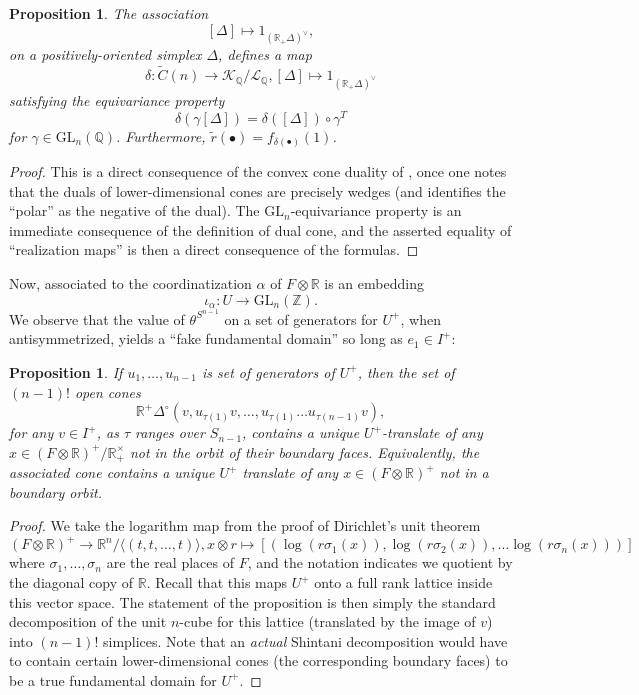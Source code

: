 \documentclass[10pt]{amsart}
\newtheorem{prop}[thm]{Proposition}
\theoremstyle{definition}
\newcommand{\Z}{\mathbb{Z}}
\newcommand{\Q}{\mathbb{Q}}
\newcommand{\R}{\mathbb{R}}
\newcommand{\GL}{\mathrm{GL}}
\numberwithin{equation}{section}
\begin{document}
        \begin{prop} \label{prop:conicalduality}
        The association 
        \[
        [\Delta]\mapsto 1_{(\R_+\Delta)^\vee},
        \]
        on a positively-oriented simplex $\Delta$, defines a map 
        \[
        \delta:\widetilde{C}(n) \to \mathcal{K}_\Q/\mathcal{L}_\Q, [\Delta]\mapsto 1_{(\R_+\Delta)^\vee}
        \]
        satisfying the equivariance property
        \[
        \delta(\gamma[\Delta]) = \delta([\Delta]) \circ \gamma^T
        \]
        for $\gamma\in \GL_n(\Q)$. Furthermore, $\widetilde{r}(\bullet) = f_{\delta(\bullet)}(1)$.
        \end{prop}
        \begin{proof}
            This is a direct consequence of the convex cone duality of \cite[IV, Theorem 1.6]{Bv}, once one notes that the duals of lower-dimensional cones are precisely wedges (and identifies the ``polar'' as the negative of the dual). The $\GL_n$-equivariance property is an immediate consequence of the definition of dual cone, and the asserted equality of ``realization maps'' is then a direct consequence of the formulas.
        \end{proof}    



    Now, associated to the coordinatization $\alpha$ of $F\otimes \R$ is an embedding
    \[
    \iota_\alpha: U \to \GL_n(\Z).
    \]
    We observe that the value of $\theta^{S^{n-1}}$ on a set of generators for $U^+$, when antisymmetrized, yields a ``fake fundamental domain'' so long as $e_1\in I^+$:
    \begin{prop} \label{prop:fakeshin}
        If $u_1,\ldots, u_{n-1}$ is set of generators of $U^+$, then the set of $(n-1)!$ open cones
        \[
        \R^+\Delta^\circ(v, u_{\tau(1)}v, \ldots,u_{\tau(1)}\ldots u_{\tau(n-1)} v),
        \]
        for any $v\in I^+$, as $\tau$ ranges over $S_{n-1}$, contains a unique $U^+$-translate of any $x\in (F\otimes \R)^+/\R_+^\times$ not in the orbit of their boundary faces. Equivalently, the associated cone contains a unique $U^+$ translate of any $x\in (F\otimes \R)^+$ not in a boundary orbit.
    \end{prop}
    \begin{proof}
        We take the logarithm map from the proof of Dirichlet's unit theorem
        \[
            (F\otimes \R)^+\to \mathbb{R}^{n}/\langle (t,t,\ldots, t)\rangle, x\otimes r \mapsto [(\log (r\sigma_1(x)), \log (r\sigma_2(x)), \ldots \log (r\sigma_n(x)))]
        \]
        where $\sigma_1,\ldots, \sigma_n$ are the real places of $F$, and the notation indicates we quotient by the diagonal copy of $\R$. Recall that this maps $U^+$ onto a full rank lattice inside this vector space. The statement of the proposition is then simply the standard decomposition of the unit $n$-cube for this lattice (translated by the image of $v$) into $(n-1)!$ simplices. Note that an \emph{actual} Shintani decomposition would have to contain certain lower-dimensional cones (the corresponding boundary faces) to be a true fundamental domain for $U^+$. 
    \end{proof}
    
\end{document}
